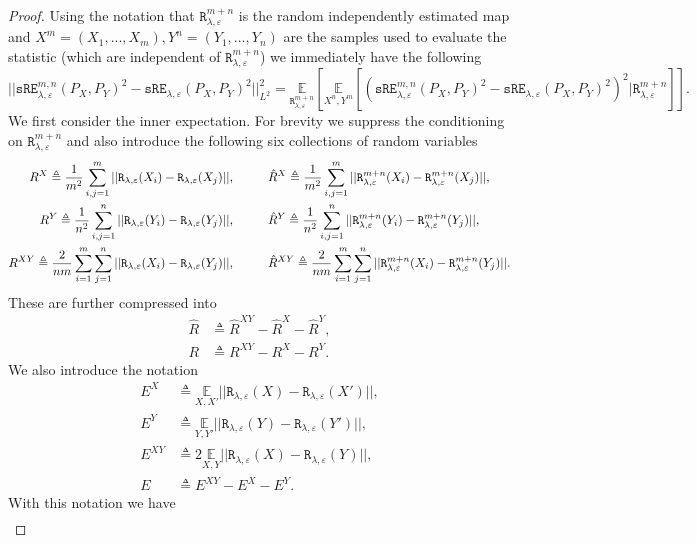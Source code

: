 \documentclass{article}
\theoremstyle{definition}
\newcommand{\sR}{\mathtt{R}_{\lambda,\varepsilon}}
\newcommand{\sRn}{\mathtt{R}_{\lambda,\varepsilon}^{m+n}}
\newcommand{\sRE}{\mathtt{sRE}_{\lambda,\varepsilon}}
\newcommand{\sREn}{\mathtt{sRE}_{\lambda, \varepsilon}^{m,n}}
\begin{document}
\begin{proof}
    Using the notation that $\sRn$ is the random independently estimated map and $X^m = (X_1,...,X_m), Y^n = (Y_1,...,Y_n)$ are the samples used to evaluate the statistic (which are independent of $\sRn$) we immediately have the following 
\[||\sREn(P_X, P_Y)^2 - \sRE(P_X,P_Y)^2||_{L^2}^2 
        = \underset{\sRn}{\mathbb{E}} \left [ \underset{X^n,Y^m}{\mathbb{E}} \left [ \left ( \sREn(P_X, P_Y)^2 - \sRE(P_X,P_Y)^2 \right )^2 \bigg | \sRn \right ] \right ].\]
    We first consider the inner expectation. For brevity we suppress the conditioning on $\sRn$ and also introduce the following six collections of random variables
    \begin{align*}
        R^X \triangleq \frac{1}{m^2}\sum_{i,j=1}^m||\sR(X_i) - \sR(X_j)||,  \hspace{0.5cm} & \hspace{0.5cm} \hat{R}^X \triangleq \frac{1}{m^2}\sum_{i,j=1}^m||\sRn(X_i) - \sRn(X_j)||, \\ 
        R^Y \triangleq \frac{1}{n^2}\sum_{i,j=1}^n||\sR(Y_i) - \sR(Y_j)||,  \hspace{0.5cm} & \hspace{0.5cm} \hat{R}^Y \triangleq \frac{1}{n^2}\sum_{i,j=1}^n||\sRn(Y_i) - \sRn(Y_j)||, \\ 
        R^{XY} \triangleq \frac{2}{nm}\sum_{i=1}^m\sum_{j=1}^n||\sR(X_i) - \sR(Y_j)||,  \hspace{0.5cm} & \hspace{0.5cm} \hat{R}^{XY} \triangleq \frac{2}{nm}\sum_{i=1}^m\sum_{j=1}^n||\sRn(X_i) - \sRn(Y_j)||.
    \end{align*}
    These are further compressed into 
    \begin{align*}
        \hat{R} &\triangleq \hat{R}^{XY} - \hat{R}^{X} - \hat{R}^{Y}, \\
        R &\triangleq R^{XY} - R^X - R^Y.
    \end{align*}
    We also introduce the notation
    \begin{align*}
        E^X &\triangleq \underset{X,X'}{\mathbb{E}}||\sR(X) - \sR(X')||, \\
        E^Y &\triangleq \underset{Y,Y'}{\mathbb{E}}||\sR(Y) - \sR(Y')||, \\
        E^{XY} &\triangleq 2\underset{X,Y}{\mathbb{E}}||\sR(X) - \sR(Y)||, \\
        E &\triangleq E^{XY} - E^X - E^Y.
    \end{align*}
    With this notation we have
    \begin{align*}

\end{align*}
\end{proof}
\end{document}
